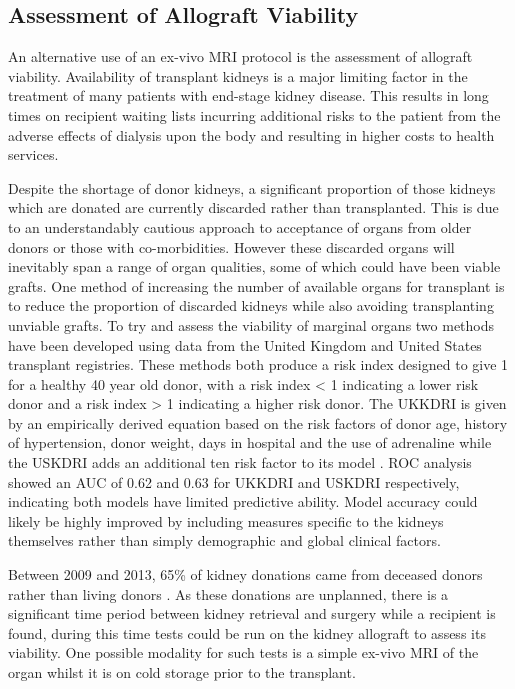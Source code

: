 \newpage
\subsection{Assessment of Allograft Viability}
An alternative use of an ex-vivo \ac{MRI} protocol is the assessment of allograft viability. Availability of transplant kidneys is a major limiting factor in the treatment of many patients with end-stage kidney disease. This results in long times on recipient waiting lists incurring additional risks to the patient from the adverse effects of dialysis upon the body and resulting in higher costs to health services. 

Despite the shortage of donor kidneys, a significant proportion of those kidneys which are donated are currently discarded rather than transplanted. This is due to an understandably cautious approach to acceptance of organs from older donors or those with co-morbidities. However these discarded organs will inevitably span a range of organ qualities, some of which could have been viable grafts. One method of increasing the number of available organs for transplant is to reduce the proportion of discarded kidneys while also avoiding transplanting unviable grafts. To try and assess the viability of marginal organs two methods have been developed using data from the United Kingdom and United States transplant registries. These methods both produce a risk index designed to give 1 for a healthy 40 year old donor, with a risk index < 1 indicating a lower risk donor and a risk index > 1 indicating a higher risk donor. The \ac{UKKDRI} is given by an empirically derived equation based on the risk factors of donor age, history of hypertension, donor weight, days in hospital and the use of adrenaline \cite{watson_simplified_2012} while the \ac{USKDRI} adds an additional ten risk factor to its model \cite{rao_comprehensive_2009}. \ac{ROC} analysis showed an \ac{AUC} of 0.62 and 0.63 for \ac{UKKDRI} and \ac{USKDRI} respectively, indicating both models have limited predictive ability. Model accuracy could likely be highly improved by including measures specific to the kidneys themselves rather than simply demographic and global clinical factors.

\newpage
Between 2009 and 2013, 65\% of kidney donations came from deceased donors rather than living donors \cite{burton_causes_2019}. As these donations are unplanned, there is a significant time period between kidney retrieval and surgery while a recipient is found, during this time tests could be run on the kidney allograft to assess its viability. One possible modality for such tests is a simple ex-vivo \ac{MRI} of the organ whilst it is on cold storage prior to the transplant.

